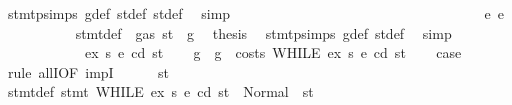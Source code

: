 \begin{isabellebody}
\ stmt{\isachardot}{\kern0pt}psimps{\isacharparenleft}{\kern0pt}{}{\isacharparenright}{\kern0pt}\ g{\isacharunderscore}{\kern0pt}def\ st{\isacharprime}{\kern0pt}{\isacharunderscore}{\kern0pt}def\ st{\isacharprime}{\kern0pt}{\isacharprime}{\kern0pt}{\isacharunderscore}{\kern0pt}def\ \isamarkupfalse%
\ simp\isanewline
\ \ \ \ \ \ \ \ \ \ \isamarkupfalse%
\isanewline
\ \ \ \ \ \ \ \ \isamarkupfalse%
\isanewline
\ \ \ \ \ \ \isamarkupfalse%
\isanewline
\ \ \ \ \ \ \ \ \isamarkupfalse%
\ {\isacharparenleft}{\kern0pt}e\ e{\isacharparenright}{\kern0pt}\isanewline
\ \ \ \ \ \ \ \ \isamarkupfalse%
\ {}{\isacharparenleft}{\kern0pt}{}{\isacharparenright}{\kern0pt}\ stmt{\isacharunderscore}{\kern0pt}def\ {\isacharbackquoteopen}{\isasymnot}\ gas\ st\ {\isasymle}\ g{\isacharbackquoteclose}\ \isamarkupfalse%
\ {\isacharquery}{\kern0pt}thesis\ \isamarkupfalse%
\ stmt{\isachardot}{\kern0pt}psimps{\isacharparenleft}{\kern0pt}{}{\isacharparenright}{\kern0pt}\ g{\isacharunderscore}{\kern0pt}def\ st{\isacharprime}{\kern0pt}{\isacharunderscore}{\kern0pt}def\ \isamarkupfalse%
\ simp\isanewline
\ \ \ \ \ \ \isamarkupfalse%
\isanewline
\ \ \ \ \isamarkupfalse%
\isanewline
\ \ \isamarkupfalse%
\isanewline
{}\isamarkupfalse%
\isanewline
\ \ \isamarkupfalse%
\ {\isacharparenleft}{\kern0pt}{}\ ex\ s{}\ e\ cd\ st{\isacharparenright}{\kern0pt}\isanewline
\ \ \isamarkupfalse%
\ g\ \ {\isachardoublequoteopen}g\ {\isacharequal}{\kern0pt}\ costs\ {\isacharparenleft}{\kern0pt}WHILE\ ex\ s{}{\isacharparenright}{\kern0pt}\ e\ cd\ st{\isachardoublequoteclose}\isanewline
\ \ \isamarkupfalse%
\ {\isacharquery}{\kern0pt}case\isanewline
\ \ \isamarkupfalse%
\ {\isacharparenleft}{\kern0pt}rule\ allI{\isacharbrackleft}{\kern0pt}OF\ impI{\isacharbrackright}{\kern0pt}{\isacharparenright}{\kern0pt}\isanewline
\ \ \ \ \isamarkupfalse%
\ st{}{\isacharprime}{\kern0pt}\isanewline
\ \ \ \ \isamarkupfalse%
\ stmt{\isacharunderscore}{\kern0pt}def{\isacharcolon}{\kern0pt}\ {\isachardoublequoteopen}stmt\ {\isacharparenleft}{\kern0pt}WHILE\ ex\ s{}{\isacharparenright}{\kern0pt}\ e\ cd\ st\ {\isacharequal}{\kern0pt}\ Normal\ {\isacharparenleft}{\kern0pt}{\isacharparenleft}{\kern0pt}{\isacharparenright}{\kern0pt}{\isacharcomma}{\kern0pt}\ st{}{\isacharprime}{\kern0pt}{\isacharparenright}{\kern0pt}{\isachardoublequoteclose}\isanewline

\end{isabellebody}
